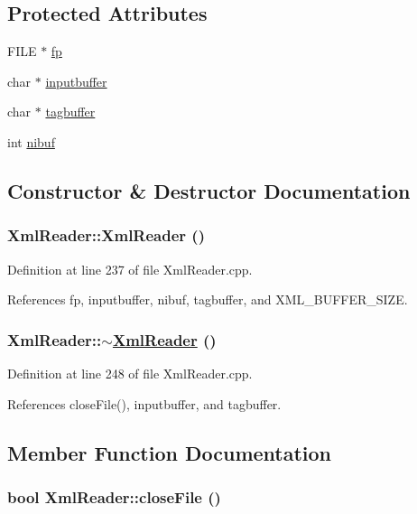 \subsection*{Protected Attributes}
\begin{CompactItemize}
\item 
FILE $\ast$ \hyperlink{classXmlReader_p0}{fp}
\item 
char $\ast$ \hyperlink{classXmlReader_p1}{inputbuffer}
\item 
char $\ast$ \hyperlink{classXmlReader_p2}{tagbuffer}
\item 
int \hyperlink{classXmlReader_p3}{nibuf}
\end{CompactItemize}


\subsection{Constructor \& Destructor Documentation}
\hypertarget{classXmlReader_a0}{
\subsubsection[XmlReader]{\setlength{\rightskip}{0pt plus 5cm}Xml\-Reader::Xml\-Reader ()}}
\label{classXmlReader_a0}




Definition at line 237 of file Xml\-Reader.cpp.

References fp, inputbuffer, nibuf, tagbuffer, and XML\_\-BUFFER\_\-SIZE.\hypertarget{classXmlReader_a1}{
\subsubsection[$\sim$XmlReader]{\setlength{\rightskip}{0pt plus 5cm}Xml\-Reader::$\sim$\hyperlink{classXmlReader}{Xml\-Reader} ()}}
\label{classXmlReader_a1}




Definition at line 248 of file Xml\-Reader.cpp.

References close\-File(), inputbuffer, and tagbuffer.

\subsection{Member Function Documentation}
\hypertarget{classXmlReader_a3}{
\subsubsection[closeFile]{\setlength{\rightskip}{0pt plus 5cm}bool Xml\-Reader::close\-File ()}}
\label{classXmlReader_a3}


